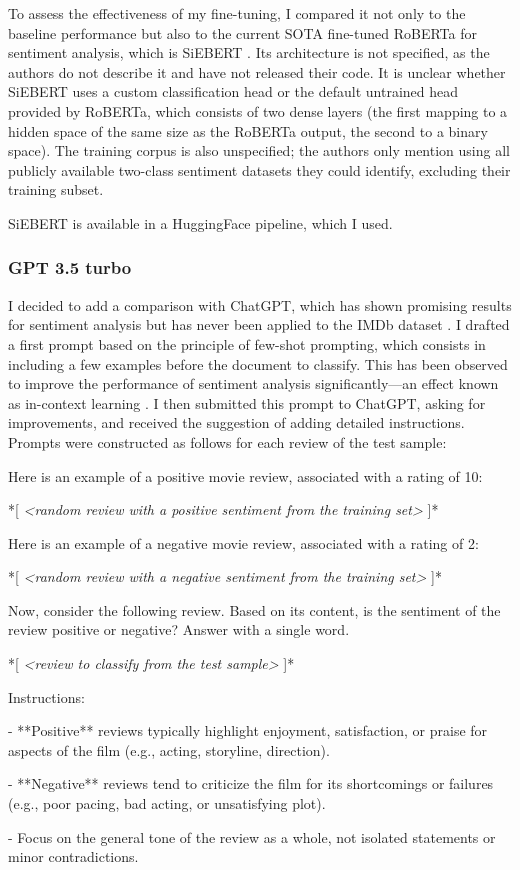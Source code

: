 \documentclass{article}
\begin{document}
To assess the effectiveness of my fine-tuning, I compared it not only to the baseline performance but also to the current SOTA fine-tuned RoBERTa for sentiment analysis, which is SiEBERT \citep{hartmann_more_2023}. Its architecture is not specified, as the authors do not describe it and have not released their code. It is unclear whether SiEBERT uses a custom classification head or the default untrained head provided by RoBERTa, which consists of two dense layers (the first mapping to a hidden space of the same size as the RoBERTa output, the second to a binary space). The training corpus is also unspecified; the authors only mention using all publicly available two-class sentiment datasets they could identify, excluding their training subset.

SiEBERT is available in a HuggingFace pipeline, which I used.

\subsubsection{GPT 3.5 turbo}

I decided to add a comparison with ChatGPT, which has shown promising results for sentiment analysis but has never been applied to the IMDb dataset \citep{wang_is_2024}. I drafted a first prompt based on the principle of few-shot prompting, which consists in including a few examples before the document to classify. This has been observed to improve the performance of sentiment analysis significantly—an effect known as in-context learning \citep{brown_language_2020}. I then submitted this prompt to ChatGPT, asking for improvements, and received the suggestion of adding detailed instructions. Prompts were constructed as follows for each review of the test sample:

\begin{displayquote}
Here is an example of a positive movie review, associated with a rating of 10:

*[ \textit{<random review with a positive sentiment from the training set>} ]*

Here is an example of a negative movie review, associated with a rating of 2:

*[ \textit{<random review with a negative sentiment from the training set>} ]*

Now, consider the following review. Based on its content, is the sentiment of the review positive or negative? Answer with a single word.

*[ \textit{<review to classify from the test sample>} ]*

Instructions:

- **Positive** reviews typically highlight enjoyment, satisfaction, or praise for aspects of the film (e.g., acting, storyline, direction).

- **Negative** reviews tend to criticize the film for its shortcomings or failures (e.g., poor pacing, bad acting, or unsatisfying plot).

- Focus on the general tone of the review as a whole, not isolated statements or minor contradictions.
\end{displayquote}
\end{document}
